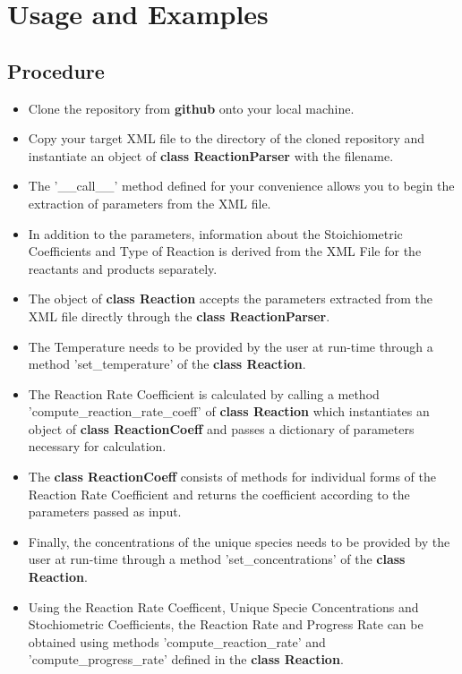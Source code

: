 \chapter{Usage and Examples}
\section{Procedure}
\begin{itemize}
    \item Clone the repository from \textbf{github} onto your local machine.
    \item Copy your target XML file to the directory of the cloned repository and instantiate an object of \textbf{class ReactionParser} with the filename.
    \item The '\_\_call\_\_' method defined for your convenience allows you to begin the extraction of parameters from the XML file.
    \item In addition to the parameters, information about the Stoichiometric Coefficients and Type of Reaction is derived from the XML File for the reactants and products separately.
    \item The object of \textbf{class Reaction} accepts the parameters extracted from the XML file directly through the \textbf{class ReactionParser}.
    \item The Temperature needs to be provided by the user at run-time through a method 'set\_temperature' of the \textbf{class Reaction}.
    \item The Reaction Rate Coefficient is calculated by calling a method 'compute\_reaction\_rate\_coeff' of \textbf{class Reaction} which instantiates an object of \textbf{class ReactionCoeff} and passes a dictionary of parameters necessary for calculation. 
    \item The \textbf{class ReactionCoeff} consists of methods for individual forms of the Reaction Rate Coefficient and returns the coefficient according to the parameters passed as input.
    \item Finally,  the concentrations of the unique species needs to be provided by the user at run-time through a method 'set\_concentrations' of the \textbf{class Reaction}.
    \item Using the Reaction Rate Coefficent, Unique Specie Concentrations and Stochiometric Coefficients, the Reaction Rate and Progress Rate can be obtained using methods 'compute\_reaction\_rate'  and 'compute\_progress\_rate' defined in the \textbf{class Reaction}.
\end{itemize}
